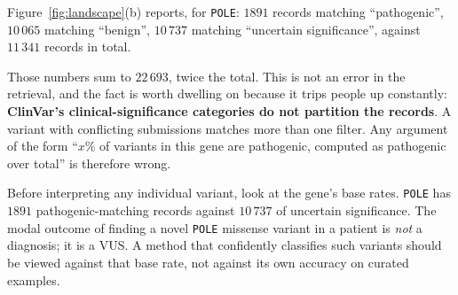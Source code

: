 Figure~\ref{fig:landscape}(b) reports, for \texttt{POLE}: $1891$ records matching
``pathogenic'', $10\,065$ matching ``benign'', $10\,737$ matching ``uncertain
significance'', against $11\,341$ records in total.

Those numbers sum to $22\,693$, twice the total. This is not an error in the
retrieval, and the fact is worth dwelling on because it trips people up
constantly: \textbf{ClinVar's clinical-significance categories do not partition
the records}. A variant with conflicting submissions matches more than one
filter. Any argument of the form ``$x\%$ of variants in this gene are pathogenic,
computed as pathogenic over total'' is therefore wrong.

\begin{remark}
Before interpreting any individual variant, look at the gene's base rates.
\texttt{POLE} has $1891$ pathogenic-matching records against $10\,737$ of
uncertain significance. The modal outcome of finding a novel \texttt{POLE}
missense variant in a patient is \emph{not} a diagnosis; it is a VUS. A method
that confidently classifies such variants should be viewed against that base
rate, not against its own accuracy on curated examples.
\end{remark}


